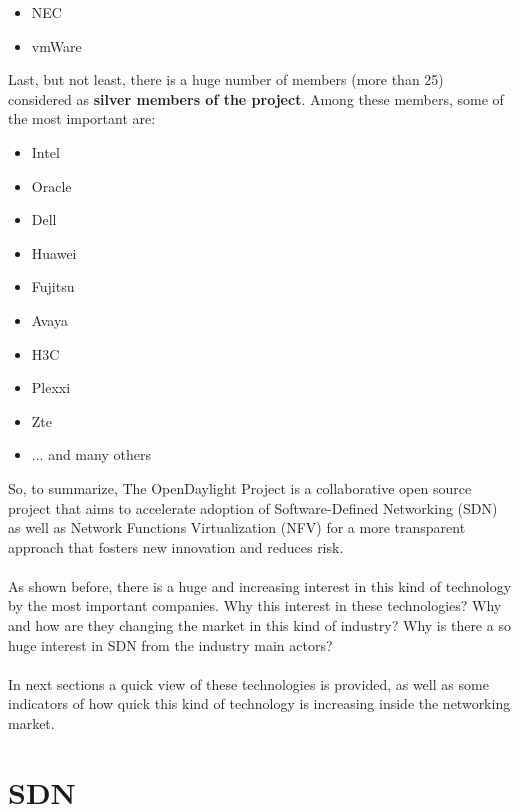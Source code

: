 \documentclass[a4paper, 12pt]{book}
\begin{document}
\begin{itemize}\itemsep0pt
 \item NEC
 \item vmWare
\end{itemize}
Last, but not least, there is a huge number of members (more than 25) considered as \textbf{silver members of the project}. Among these members, some of the most important are:
\begin{itemize}\itemsep0pt
 \item Intel
 \item Oracle
 \item Dell
 \item Huawei
 \item Fujitsu
 \item Avaya
 \item H3C
 \item Plexxi
 \item Zte
 \item ... and many others
\end{itemize}
So, to summarize, The OpenDaylight Project is a collaborative open source project that aims to accelerate adoption of Software-Defined Networking (SDN) as well as Network Functions Virtualization (NFV) for a more transparent approach that fosters new innovation and reduces risk.\\
\\
As shown before, there is a huge and increasing interest in this kind of technology by the most important companies. Why this interest in these technologies? Why and how are they changing the market in this kind of industry? Why is there a so huge interest in SDN from the industry main actors?\\
\\
In next sections a quick view of these technologies is provided, as well as some indicators of how quick this kind of technology is increasing inside the networking market.

\section{SDN}
\label{sec:sdn}
\end{document}

